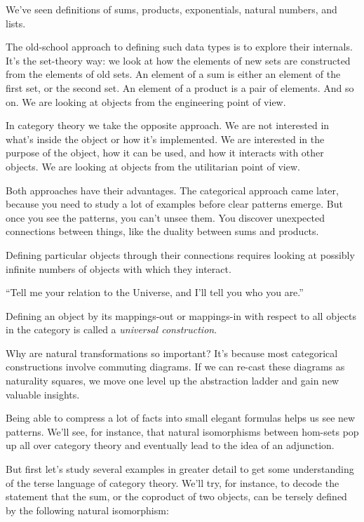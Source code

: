 \documentclass[DaoFP]{subfiles}
\begin{document}
We've seen definitions of sums, products, exponentials, natural numbers, and lists. 

The old-school approach to defining such data types is to explore their internals. It's the set-theory way: we look at how the elements of new sets are constructed from the elements of old sets. An element of a sum is either an element of the first set, or the second set. An element of a product is a pair of elements. And so on. We are looking at objects from the engineering point of view.

In category theory we take the opposite approach. We are not interested in what's inside the object or how it's implemented. We are interested in the purpose of the object, how it can be used, and how it interacts with other objects. We are looking at objects from the utilitarian point of view.

Both approaches have their advantages. The categorical approach came later, because you need to study a lot of examples before clear patterns emerge. But once you see the patterns, you can't unsee them. You discover unexpected connections between things, like the duality between sums and products.

Defining particular objects through their connections requires looking at possibly infinite numbers of objects with which they interact. 

``Tell me your relation to the Universe, and I'll tell you who you are.''

Defining an object by its mappings-out or mappings-in with respect to all objects in the category is called a \emph{universal construction}. 

Why are natural transformations so important? It's because most categorical constructions involve commuting diagrams. If we can re-cast these diagrams as naturality squares, we move one level up the abstraction ladder and gain new valuable insights.

Being able to compress a lot of facts into small elegant formulas helps us see new patterns. We'll see, for instance, that natural isomorphisms between hom-sets pop up all over category theory and eventually lead to the idea of an adjunction.

But first let's study several examples in greater detail to get some understanding of the terse language of category theory. We'll try, for instance, to decode the statement that the sum, or the coproduct of two objects, can be tersely defined by the following natural isomorphism:
\end{document}
